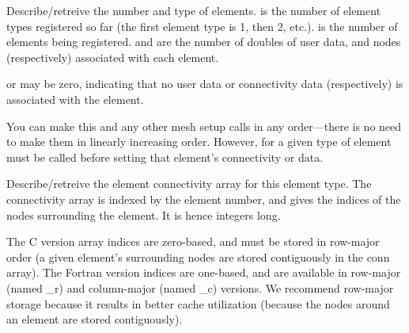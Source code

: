 \documentclass[10pt]{article}
\begin{document}
     Describe/retreive the number and type of elements.   is the
number of element types registered so far (the first element type is 1, then 2,
etc.).   is the number of elements being registered.  
and  are the number of doubles of user data, and nodes (respectively) associated with each element.
		
      or  may be zero, indicating that no user
data or connectivity data (respectively) is associated with the element.

     You can make this and any other mesh setup calls in any order---there is no need 
to make them in linearly increasing order.  However, for a given type of element
 must be called before setting that element's connectivity or data.



     Describe/retreive the element connectivity array for this element
     type.  The connectivity array is indexed by the element number,
     and gives the indices of the nodes surrounding the element.  It is
     hence  integers long.

     The C version array indices are zero-based, and must be stored in
     row-major order (a given element's surrounding nodes are stored
     contiguously in the conn array).  The Fortran version indices are
     one-based, and are available in row-major (named \_r) and
     column-major (named \_c) versions.  We recommend row-major storage
     because it results in better cache utilization (because the nodes
     around an element are stored contiguously).
     

\end{document}
